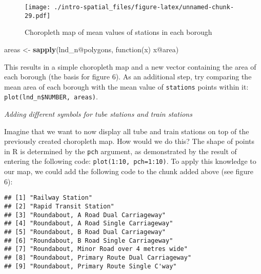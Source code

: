 \documentclass[]{article}
\newenvironment{Shaded}{}{}
\newcommand{\KeywordTok}[1]{\textcolor[rgb]{0.00,0.44,0.13}{\textbf{{#1}}}}
\newcommand{\DataTypeTok}[1]{\textcolor[rgb]{0.56,0.13,0.00}{{#1}}}
\newcommand{\StringTok}[1]{\textcolor[rgb]{0.25,0.44,0.63}{{#1}}}
\newcommand{\CommentTok}[1]{\textcolor[rgb]{0.38,0.63,0.69}{\textit{{#1}}}}
\newcommand{\NormalTok}[1]{{#1}}
\begin{document}
\begin{figure}[htbp]
\centering
\texttt{[image: ./intro-spatial\_files/figure-latex/unnamed-chunk-29.pdf]}
\caption{Choropleth map of mean values of stations in each borough}
\end{figure}

\begin{Shaded}
\begin{Highlighting}[]
\NormalTok{areas <-}\StringTok{ }\KeywordTok{sapply}\NormalTok{(lnd_n@polygons, function(x) x@area)}
\end{Highlighting}
\end{Shaded}

This results in a simple choropleth map and a new vector containing the
area of each borough (the basis for figure 6). As an additional step,
try comparing the mean area of each borough with the mean value of
\texttt{stations} points within it:
\texttt{plot(lnd\_n\$NUMBER, areas)}.

\emph{Adding different symbols for tube stations and train stations}

Imagine that we want to now display all tube and train stations on top
of the previously created choropleth map. How would we do this? The
shape of points in R is determined by the \texttt{pch} argument, as
demonstrated by the result of entering the following code:
\texttt{plot(1:10, pch=1:10)}. To apply this knowledge to our map, we
could add the following code to the chunk added above (see figure 6):

\begin{Shaded}
\end{Shaded}

\begin{verbatim}
## [1] "Railway Station"                           
## [2] "Rapid Transit Station"                     
## [3] "Roundabout, A Road Dual Carriageway"       
## [4] "Roundabout, A Road Single Carriageway"     
## [5] "Roundabout, B Road Dual Carriageway"       
## [6] "Roundabout, B Road Single Carriageway"     
## [7] "Roundabout, Minor Road over 4 metres wide" 
## [8] "Roundabout, Primary Route Dual Carriageway"
## [9] "Roundabout, Primary Route Single C'way"
\end{verbatim}
\end{document}
